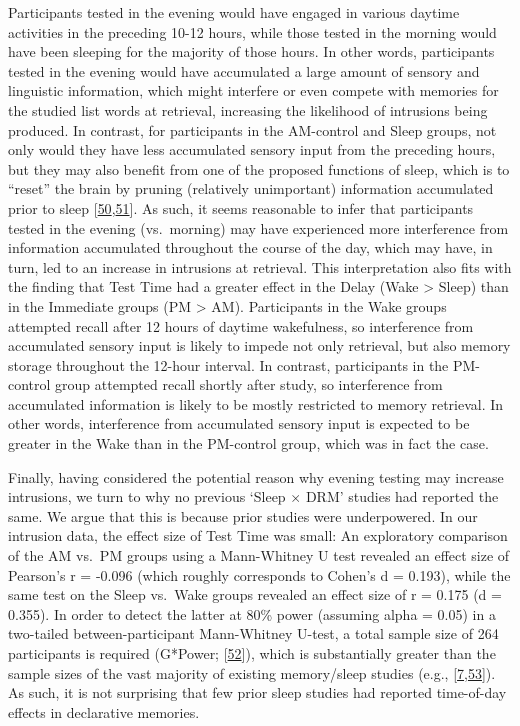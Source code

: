 \documentclass[
]{article}
\begin{document}
Participants tested in the evening would have engaged in various daytime activities in the preceding 10-12 hours, while those tested in the morning would have been sleeping for the majority of those hours. In other words, participants tested in the evening would have accumulated a large amount of sensory and linguistic information, which might interfere or even compete with memories for the studied list words at retrieval, increasing the likelihood of intrusions being produced. In contrast, for participants in the AM-control and Sleep groups, not only would they have less accumulated sensory input from the preceding hours, but they may also benefit from one of the proposed functions of sleep, which is to ``reset'' the brain by pruning (relatively unimportant) information accumulated prior to sleep {[}\protect\hyperlink{ref-tononi2006a}{50},\protect\hyperlink{ref-tononi2014a}{51}{]}. As such, it seems reasonable to infer that participants tested in the evening (vs.~morning) may have experienced more interference from information accumulated throughout the course of the day, which may have, in turn, led to an increase in intrusions at retrieval. This interpretation also fits with the finding that Test Time had a greater effect in the Delay (Wake \textgreater{} Sleep) than in the Immediate groups (PM \textgreater{} AM). Participants in the Wake groups attempted recall after 12 hours of daytime wakefulness, so interference from accumulated sensory input is likely to impede not only retrieval, but also memory storage throughout the 12-hour interval. In contrast, participants in the PM-control group attempted recall shortly after study, so interference from accumulated information is likely to be mostly restricted to memory retrieval. In other words, interference from accumulated sensory input is expected to be greater in the Wake than in the PM-control group, which was in fact the case.

Finally, having considered the potential reason why evening testing may increase intrusions, we turn to why no previous `Sleep \(\times\) DRM' studies had reported the same. We argue that this is because prior studies were underpowered. In our intrusion data, the effect size of Test Time was small: An exploratory comparison of the AM vs.~PM groups using a Mann-Whitney U test revealed an effect size of Pearson's r = -0.096 (which roughly corresponds to Cohen's d = 0.193), while the same test on the Sleep vs.~Wake groups revealed an effect size of r = 0.175 (d = 0.355). In order to detect the latter at 80\% power (assuming alpha = 0.05) in a two-tailed between-participant Mann-Whitney U-test, a total sample size of 264 participants is required (G*Power; {[}\protect\hyperlink{ref-faul2009a}{52}{]}), which is substantially greater than the sample sizes of the vast majority of existing memory/sleep studies (e.g., {[}\protect\hyperlink{ref-payne2009a}{7},\protect\hyperlink{ref-yaremenko2021a}{53}{]}). As such, it is not surprising that few prior sleep studies had reported time-of-day effects in declarative memories.
\end{document}
